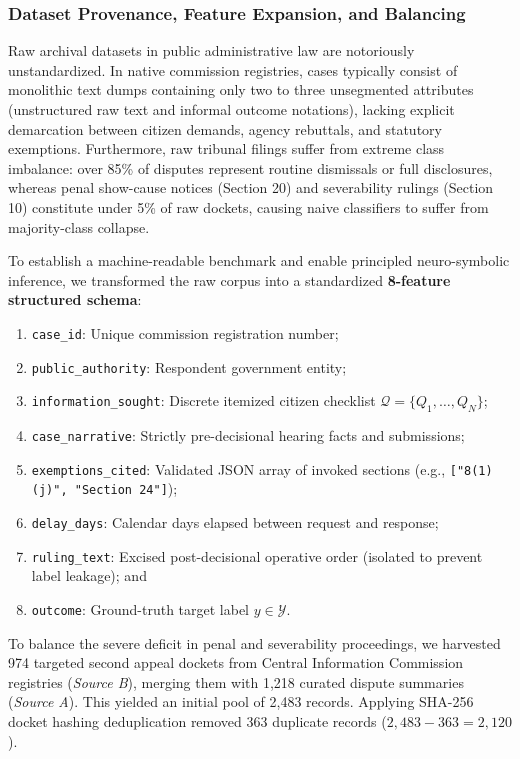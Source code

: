 \documentclass[conference]{IEEEtran}
\begin{document}
\subsubsection{Dataset Provenance, Feature Expansion, and Balancing}
Raw archival datasets in public administrative law are notoriously unstandardized. In native commission registries, cases typically consist of monolithic text dumps containing only two to three unsegmented attributes (unstructured raw text and informal outcome notations), lacking explicit demarcation between citizen demands, agency rebuttals, and statutory exemptions. Furthermore, raw tribunal filings suffer from extreme class imbalance: over 85\% of disputes represent routine dismissals or full disclosures, whereas penal show-cause notices (Section 20) and severability rulings (Section 10) constitute under 5\% of raw dockets, causing naive classifiers to suffer from majority-class collapse.

To establish a machine-readable benchmark and enable principled neuro-symbolic inference, we transformed the raw corpus into a standardized \textbf{8-feature structured schema}:
\begin{enumerate}
    \setlength{\itemsep}{1pt}\setlength{\parskip}{0pt}\setlength{\parsep}{0pt}
    \item \texttt{case\_id}: Unique commission registration number;
    \item \texttt{public\_authority}: Respondent government entity;
    \item \texttt{information\_sought}: Discrete itemized citizen checklist $\mathcal{Q}=\{Q_1, \dots, Q_N\}$;
    \item \texttt{case\_narrative}: Strictly pre-decisional hearing facts and submissions;
    \item \texttt{exemptions\_cited}: Validated JSON array of invoked sections (e.g., \texttt{["8(1)(j)", "Section 24"]});
    \item \texttt{delay\_days}: Calendar days elapsed between request and response;
    \item \texttt{ruling\_text}: Excised post-decisional operative order (isolated to prevent label leakage); and
    \item \texttt{outcome}: Ground-truth target label $y \in \mathcal{Y}$.
\end{enumerate}

To balance the severe deficit in penal and severability proceedings, we harvested 974 targeted second appeal dockets from Central Information Commission registries (\textit{Source B}), merging them with 1,218 curated dispute summaries (\textit{Source A}). This yielded an initial pool of 2,483 records. Applying SHA-256 docket hashing deduplication removed 363 duplicate records ($2,483 - 363 = 2,120$).
\end{document}
